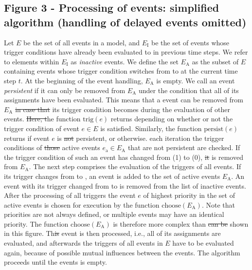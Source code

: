 \documentclass[10pt]{bmc_article}
\newenvironment{bmcformat}{\fussy\setboolean{publ}{true}}{\fussy}
\begin{document}
\begin{bmcformat}
\subsection*{Figure 3 - Processing of events: simplified algorithm (handling of delayed events omitted)}
Let $E$ be the set of all events in a model, and $E_\mathrm{I}$ be the set of events whose trigger conditions have already been evaluated to \true in previous time steps. 
We refer to elements within $E_\mathrm{I}$ as \emph{inactive} events.
We define the set $E_\mathrm{A}$ as the subset of $E$ containing events whose trigger condition switches from \false to \true at the current time step $t$.
At the beginning of the event handling, $E_\mathrm{A}$ is empty.
We call an event \emph{persistent}\COR{,} if it can only be removed from $E_\mathrm{A}$ under the condition that all of its assignments have been evaluated.
This means that a  event can be removed from $E_\mathrm{A}$ \sout{in case that} its trigger condition becomes \false during the evaluation of other events.
\sout{Here, t}he function $\mathrm{trig}(e)$ returns  depending on whether or not the trigger condition of event $e \in E$ is satisfied.
Similarly, the function $\mathrm{persist}(e)$ returns  if event $e$ is \sout{not} persistent, or  otherwise.
 each iteration\COR{,} the trigger conditions of \sout{those} active events $e_\mathrm{a} \in E_\mathrm{A}$ that are not persistent are checked.
If the trigger condition of such an event has changed from \true (1) to \false (0), \sout{it} is removed from $E_\mathrm{A}$.
The next step comprises the evaluation of the triggers of all events.
If its trigger changes from \false to \true, an event is added to the set of active events $E_\mathrm{A}$.
An event with its trigger changed from \true to \false is removed from the list of inactive events.
After the processing of all triggers\COR{,} the event $e$ of highest priority in the set of active events is chosen for execution by the function $\mathrm{choose}(E_\mathrm{A})$.
Note that priorities are not always defined, or multiple events may have an identical priority.
The function $\mathrm{choose}(E_\mathrm{A})$ is therefore more complex than \sout{can be} shown in this figure.
Th\sout{is} event is then processed, i.e., all of its assignments are evaluated, and afterwards the triggers of all events in $E$ have to be evaluated again, because of possible mutual influences between the events.
The algorithm proceeds until the  events is empty.


\end{bmcformat}
\end{document}
